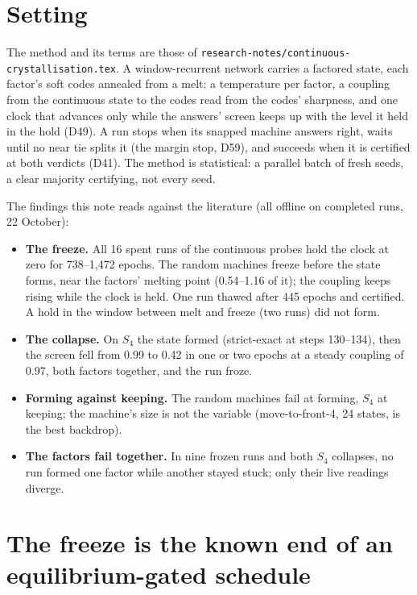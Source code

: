 \documentclass[11pt]{article}
\begin{document}
\section{Setting}

The method and its terms are those of \texttt{research-notes/continuous-crystallisation.tex}. A window-recurrent
network carries a factored state, each factor's soft codes annealed from a melt: a temperature per
factor, a coupling from the continuous state to the codes read from the codes' sharpness, and one
clock that advances only while the answers' screen keeps up with the level it held in the hold
(D49). A run stops when its snapped machine answers right, waits until no near tie splits it (the
margin stop, D59), and succeeds when it is certified at both verdicts (D41). The method is
statistical: a parallel batch of fresh seeds, a clear majority certifying, not every seed.

The findings this note reads against the literature (all offline on completed runs,
22 October):
\begin{itemize}
\item \textbf{The freeze.} All 16 spent runs of the continuous probes hold the clock at zero for
738--1{,}472 epochs. The random machines freeze before the state forms, near the factors' melting
point (0.54--1.16 of it); the coupling keeps rising while the clock is held. One run thawed after
445 epochs and certified. A hold in the window between melt and freeze (two runs) did not form.
\item \textbf{The collapse.} On $S_4$ the state formed (strict-exact at steps 130--134), then the
screen fell from 0.99 to 0.42 in one or two epochs at a steady coupling of 0.97, both factors
together, and the run froze.
\item \textbf{Forming against keeping.} The random machines fail at forming, $S_4$ at keeping; the
machine's size is not the variable (move-to-front-4, 24 states, is the best backdrop).
\item \textbf{The factors fail together.} In nine frozen runs and both $S_4$ collapses, no run formed
one factor while another stayed stuck; only their live readings diverge.
\end{itemize}

\section{The freeze is the known end of an equilibrium-gated schedule}
\end{document}
